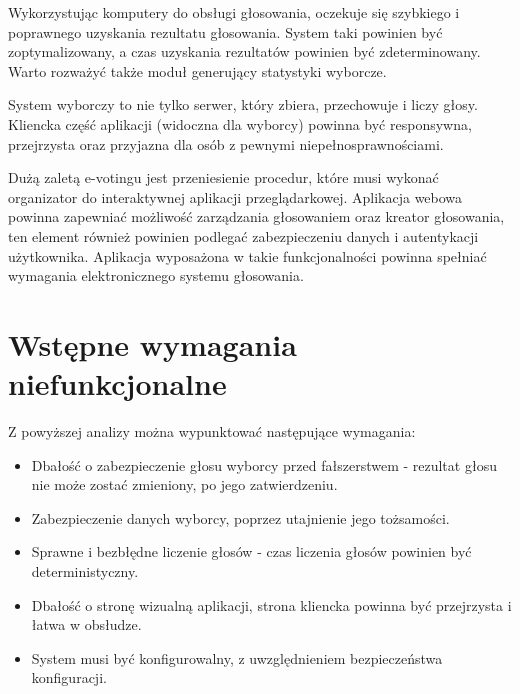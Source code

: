 \documentclass[a4paper,12pt]{book}
\begin{document}
Wykorzystując komputery do obsługi głosowania, oczekuje się szybkiego i poprawnego uzyskania rezultatu głosowania. System taki powinien być zoptymalizowany, a czas uzyskania rezultatów powinien być zdeterminowany. Warto rozważyć także moduł generujący statystyki wyborcze.

System wyborczy to nie tylko serwer, który zbiera, przechowuje i liczy głosy. Kliencka część aplikacji (widoczna dla wyborcy) powinna być responsywna, przejrzysta oraz przyjazna dla osób z pewnymi niepełnosprawnościami.

Dużą zaletą e-votingu jest przeniesienie procedur, które musi wykonać organizator do interaktywnej aplikacji przeglądarkowej. Aplikacja webowa powinna zapewniać możliwość zarządzania głosowaniem oraz kreator głosowania, ten element również powinien podlegać zabezpieczeniu danych i autentykacji użytkownika. Aplikacja wyposażona w takie funkcjonalności powinna spełniać wymagania elektronicznego systemu głosowania.

\section{Wstępne wymagania niefunkcjonalne}
Z powyższej analizy można wypunktować następujące wymagania:
\begin{itemize}

\item Dbałość o zabezpieczenie głosu wyborcy przed fałszerstwem - rezultat głosu nie może zostać zmieniony, po jego zatwierdzeniu.

\item Zabezpieczenie danych wyborcy, poprzez utajnienie jego tożsamości.

\item Sprawne i bezbłędne liczenie głosów - czas liczenia głosów powinien być deterministyczny.

\item Dbałość o stronę wizualną aplikacji, strona kliencka powinna być przejrzysta i łatwa w obsłudze.

\item System musi być konfigurowalny, z uwzględnieniem bezpieczeństwa konfiguracji.
\end{itemize}
\end{document}
